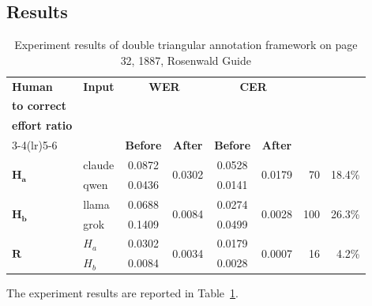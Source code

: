 \subsection{Results}
\begin{table}[htbp]
\centering
\small
\setlength{\tabcolsep}{4.5pt}
\renewcommand{\arraystretch}{1.15}
\caption{Experiment results of double triangular annotation framework on page 32, 1887, Rosenwald Guide}
\label{tab:res-triangle}
\begin{tabular}{llccccrr}
\toprule
\textbf{Human} & \textbf{Input} &
\multicolumn{2}{c}{\textbf{WER}} & \multicolumn{2}{c}{\textbf{CER}} &
\makecell{\textbf{Fields}\\\textbf{to correct}} &
\makecell{\textbf{Human}\\\textbf{effort ratio}} \\
\cmidrule(lr){3-4}\cmidrule(lr){5-6}
& & \textbf{Before} & \textbf{After} & \textbf{Before} & \textbf{After} & & \\
\midrule
\multirow{2}{*}{$\mathbf{H_a}$} & claude & 0.0872 & \multirow{2}{*}{0.0302} & 0.0528 & \multirow{2}{*}{0.0179} & \multirow{2}{*}{70}  & \multirow{2}{*}{18.4\%} \\
                               & qwen   & 0.0436 &                       & 0.0141 &                       &                      &                         \\
\midrule
\multirow{2}{*}{$\mathbf{H_b}$} & llama & 0.0688 & \multirow{2}{*}{0.0084} & 0.0274 & \multirow{2}{*}{0.0028} & \multirow{2}{*}{100} & \multirow{2}{*}{26.3\%} \\
                               & grok  & 0.1409 &                       & 0.0499 &                       &                      &                         \\
\midrule
\multirow{2}{*}{$\mathbf{R}$}   & $H_a$ & 0.0302 & \multirow{2}{*}{0.0034} & 0.0179 & \multirow{2}{*}{0.0007} & \multirow{2}{*}{16}  & \multirow{2}{*}{4.2\%}  \\
                               & $H_b$ & 0.0084 &                       & 0.0028 &                       &                      &                         \\
\bottomrule
\end{tabular}
\end{table}

The experiment results are reported in Table~\ref{tab:res-triangle}.

